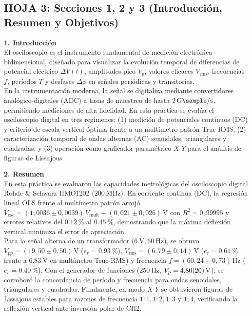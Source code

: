 \documentclass[a4paper, 11pt]{article}
\begin{document}
\subsection*{\color{uni-blue} HOJA 3: Secciones 1, 2 y 3 (Introducción, Resumen y Objetivos)}
\begin{tcolorbox}[title=Texto a Escribir: Sección 1 (Introducción), colframe=black]
    \small
    \textbf{\large 1. Introducción}\\[0.15cm]
    El osciloscopio es el instrumento fundamental de medición electrónica bidimensional, diseñado para visualizar la evolución temporal de diferencias de potencial eléctrico $\Delta V(t)$, amplitudes pico $V_p$, valores eficaces $V_{\text{rms}}$, frecuencias $f$, períodos $T$ y desfases $\Delta\phi$ en señales periódicas y transitorias.\\[0.15cm]
    En la instrumentación moderna, la señal se digitaliza mediante convertidores analógico-digitales (ADC) a tasas de muestreo de hasta $\qty{2}{\giga\sample\per\second}$, permitiendo mediciones de alta fidelidad. En esta práctica se evalúa el osciloscopio digital en tres regímenes: (1) medición de potenciales continuos (DC) y criterio de escala vertical óptima frente a un multímetro patrón True-RMS, (2) caracterización temporal de ondas alternas (AC) senoidales, triangulares y cuadradas, y (3) operación como graficador paramétrico $X$-$Y$ para el análisis de figuras de Lissajous.
\end{tcolorbox}

\begin{tcolorbox}[title=Texto a Escribir: Sección 2 (Resumen), colframe=black]
    \small
    \textbf{\large 2. Resumen}\\[0.15cm]
    En esta práctica se evaluaron las capacidades metrológicas del osciloscopio digital Rohde \& Schwarz HMO1202 ($\qty{200}{\mega\hertz}$). En corriente continua (DC), la regresión lineal OLS frente al multímetro patrón arrojó $V_{\text{osc}} = (1{,}0036 \pm 0{,}0039)\,V_{\text{mult}} - (0{,}021 \pm 0{,}026)\,\unit{\volt}$ con $R^2 = 0{,}99995$ y errores relativos del $\qty{0,12}{\percent}$ al $\qty{0,45}{\percent}$, demostrando que la máxima deflexión vertical minimiza el error de apreciación.\\[0.15cm]
    Para la señal alterna de un transformador ($\qty{6}{\volt}, \qty{60}{\hertz}$), se obtuvo $V_{pp} = (19{,}50 \pm 0{,}50)\,\unit{\volt}$ ($e_r = \qty{0,93}{\percent}$), $V_{\text{rms}} = (6{,}79 \pm 0{,}14)\,\unit{\volt}$ ($e_r = \qty{0,61}{\percent}$ frente a $\qty{6,83}{\volt}$ en multímetro True-RMS) y frecuencia $f = (60{,}24 \pm 0{,}73)\,\unit{\hertz}$ ($e_r = \qty{0,40}{\percent}$). Con el generador de funciones ($\qty{250}{\hertz}$, $V_p = \qty{4,80 \pm 0,20}{\volt}$), se corroboró la concordancia de período y frecuencia para ondas senoidales, triangulares y cuadradas. Finalmente, en modo $X$-$Y$ se obtuvieron figuras de Lissajous estables para razones de frecuencia $1:1, 1:2, 1:3$ y $1:4$, verificando la reflexión vertical ante inversión polar de $\text{CH2}$.
\end{tcolorbox}
\end{document}
